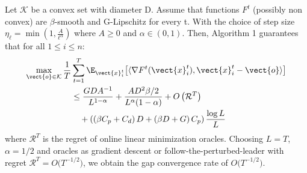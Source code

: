 \begin{theorem}
\label{thm:gap}
Let $\mathcal{K}$ be a convex set with diameter D. Assume that functions $F^{t}$ (possibly non convex) are $\beta$-smooth and G-Lipschitz for every t. With the choice of step size $\eta_{\ell} = \min\left(1, \frac{A}{\ell^{\alpha}}\right)$ where $A \geq 0$ and $\alpha \in (0,1)$. 
Then, Algorithm 1 guarantees that for all $1 \leq i \leq n$:
%
    \begin{align*}
       \max_{\vect{o} \in \mathcal{K}}\frac{1}{T} &\sum_{t=1}^{T} \E_{\vect{x}^t_i} \bigl [\langle \nabla F^{t}(\vect{x}^t_{i}), \vect{x}^t_{i} - \vect{o}\rangle \bigr] \nonumber \\
       &\leq \frac{GDA^{-1}}{L^{1-\alpha}}  
         + \frac{AD^2 \beta/2}{L^{\alpha}(1-\alpha)} + O \left(\mathcal{R}^{T}\right) \notag \\
        & \quad + \left(\left( \beta C_p + C_d \right)D + \left(\beta D + G \right)C_p \right)\frac{\log L}{L}
    \end{align*}
where $\mathcal{R}^T$ is the regret of online linear minimization oracles.
Choosing $L=T$, $\alpha = 1/2$ and oracles as gradient descent or follow-the-perturbed-leader with regret $\mathcal{R}^T =
O\bigl(T^{-1/2}\bigr)$, we obtain the gap convergence rate of $O\bigl(T^{-1/2}\bigr)$.
\end{theorem}
%
